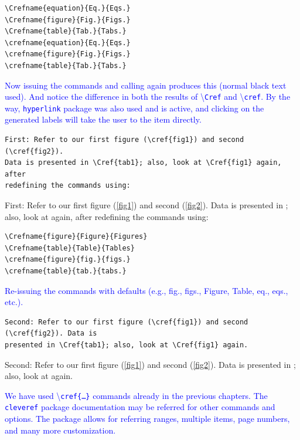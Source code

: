 \documentclass[phd]{ndsu-thesis-2022}
\newcommand\italk[1]{\textcolor{blue}{#1}}  %
\newcommand\cmd[1]{\textbackslash\texttt{#1}}  %
\newcommand\vb[1]{\textcolor{blue}{\texttt{#1}}}%
\begin{document}
\begin{verbatim}
\Crefname{equation}{Eq.}{Eqs.}
\Crefname{figure}{Fig.}{Figs.}
\Crefname{table}{Tab.}{Tabs.}
\crefname{equation}{Eq.}{Eqs.}
\crefname{figure}{Fig.}{Figs.}
\crefname{table}{Tab.}{Tabs.}
\end{verbatim}

\italk{Now issuing the commands and calling again produces this (normal black text used). And notice the difference in both the results of \cmd{Cref} and \cmd{cref}. By the way, \texttt{hyperlink} package was also used and is active, and clicking on the generated labels will take the user to the item directly. }


{\singlespacing
\begin{verbatim}
First: Refer to our first figure (\cref{fig1}) and second (\cref{fig2}). 
Data is presented in \Cref{tab1}; also, look at \Cref{fig1} again, after 
redefining the commands using:
\end{verbatim}
}
First: Refer to our first figure (\cref{fig1}) and second (\cref{fig2}). Data is presented in ; also, look at  again, after redefining the commands using:

\begin{verbatim}
\Crefname{figure}{Figure}{Figures}
\Crefname{table}{Table}{Tables}
\crefname{figure}{fig.}{figs.}
\crefname{table}{tab.}{tabs.}
\end{verbatim}


\italk{Re-issuing the commands with defaults (e.g., fig., figs., Figure, Table, eq., eqs., etc.).}


{\singlespacing
\begin{verbatim}
Second: Refer to our first figure (\cref{fig1}) and second (\cref{fig2}). Data is 
presented in \Cref{tab1}; also, look at \Cref{fig1} again. 
\end{verbatim}
}
Second: Refer to our first figure (\cref{fig1}) and second (\cref{fig2}). Data is presented in ; also, look at  again. 

\italk{We have used \cmd{cref\{\ldots\}} commands already in the previous chapters. The \vb{cleveref} package documentation may be referred for other commands and options. The package allows for referring ranges, multiple items, page numbers, and many more customization.  
}
\end{document}
